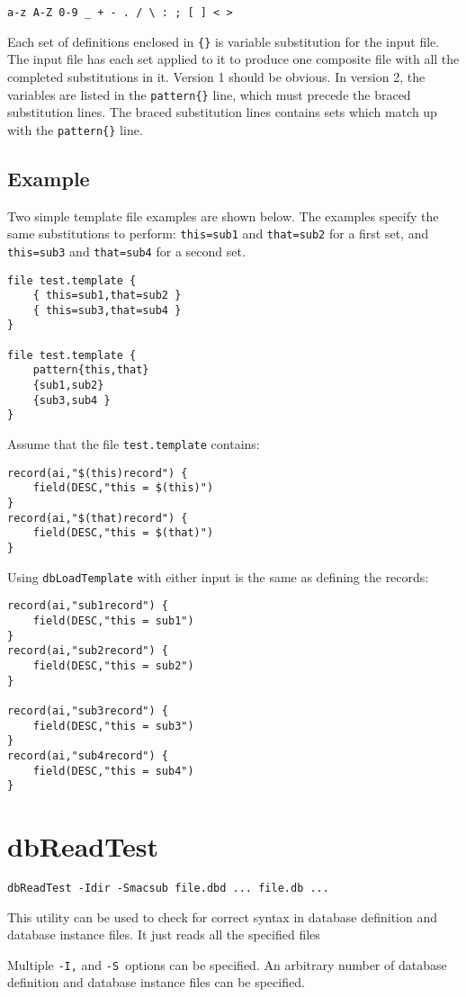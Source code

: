 \begin{verbatim}
a-z A-Z 0-9 _ + - . / \ : ; [ ] < >
\end{verbatim}

Each set of definitions enclosed in \verb|{}| is variable substitution for the input file. The input file has each set applied to it to
produce one composite file with all the completed substitutions in it. Version 1 should be obvious. In version 2, the
variables are listed in the \verb|pattern{}| line, which must precede the braced substitution lines. The braced substitution
lines contains sets which match up with the \verb|pattern{}| line.

\subsection{Example}

Two simple template file examples are shown below. The examples specify the same substitutions to perform: 
\verb|this=sub1| and \verb|that=sub2| for a first set, and \verb|this=sub3| and \verb|that=sub4| for a second set. 

\begin{verbatim}
file test.template {
    { this=sub1,that=sub2 }
    { this=sub3,that=sub4 }
}

file test.template {
    pattern{this,that}
    {sub1,sub2}
    {sub3,sub4 }
}
\end{verbatim}

Assume that the file \verb|test.template| contains:

\begin{verbatim}
record(ai,"$(this)record") {
    field(DESC,"this = $(this)")
}
record(ai,"$(that)record") {
    field(DESC,"this = $(that)")
}
\end{verbatim}

Using \verb|dbLoadTemplate| with either input is the same as defining the records:

\begin{verbatim}
record(ai,"sub1record") {
    field(DESC,"this = sub1")
}
record(ai,"sub2record") {
    field(DESC,"this = sub2")
}

record(ai,"sub3record") {
    field(DESC,"this = sub3")
}
record(ai,"sub4record") {
    field(DESC,"this = sub4")
}
\end{verbatim}

\section{dbReadTest}

\begin{verbatim}
dbReadTest -Idir -Smacsub file.dbd ... file.db ...
\end{verbatim}

This utility can be used to check for correct syntax in database definition and database instance files. It just reads all the 
specified files

Multiple \verb|-I,| and \verb|-S |options can be specified. An arbitrary number of database definition and database instance files can 
be specified.
